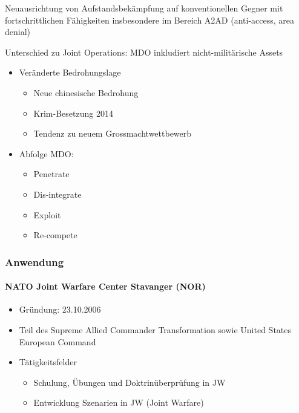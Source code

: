 {}\documentclass[a4paper]{article}
\providecommand{\tightlist}{\setlength{\itemsep}{1mm}\setlength{\parskip}{1mm}}
\begin{document}
Neuausrichtung von Aufstandsbekämpfung auf konventionellen Gegner mit
fortschrittlichen Fähigkeiten insbesondere im Bereich A2AD (anti-access,
area denial)

Unterschied zu Joint Operations: MDO inkludiert nicht-militärische
Assets

\begin{itemize}
	\tightlist
	\item
	      Veränderte Bedrohungslage

	      \begin{itemize}
		      \tightlist
		      \item
		            Neue chinesische Bedrohung
		      \item
		            Krim-Besetzung 2014
		      \item
		            Tendenz zu neuem Grossmachtwettbewerb
	      \end{itemize}
	\item
	      Abfolge MDO:

	      \begin{itemize}
		      \tightlist
		      \item
		            Penetrate
		      \item
		            Dis-integrate
		      \item
		            Exploit
		      \item
		            Re-compete
	      \end{itemize}
\end{itemize}

\subsubsection{Anwendung}\label{anwendung}

\paragraph{NATO Joint Warfare Center Stavanger
	(NOR)}\label{nato-joint-warfare-center-stavanger-nor}

\begin{itemize}
	\tightlist
	\item
	      Gründung: 23.10.2006
	\item
	      Teil des Supreme Allied Commander Transformation sowie United States
	      European Command
	\item
	      Tätigkeitsfelder

	      \begin{itemize}
		      \tightlist
		      \item
		            Schulung, Übungen und Doktrinüberprüfung in JW
		      \item
		            Entwicklung Szenarien in JW (Joint Warfare)
	      \end{itemize}
\end{itemize}
\end{document}
